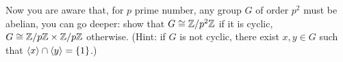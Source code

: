 \begin{exercise}
Now you are aware that, for \(p\) prime number, any group \(G\) of order \(p^2\) must be abelian, you can go deeper: show that \(G \cong \mathbb Z/p^2\mathbb Z\) if it is cyclic, \(G \cong \mathbb Z/p\mathbb Z \times \mathbb Z/p\mathbb Z\) otherwise. (Hint: if \(G\) is not cyclic, there exist \(x, y \in G\) such that \(\left\langle x\right\rangle \cap \left\langle y\right\rangle = \left\{1\right\}\).)
\end{exercise}

